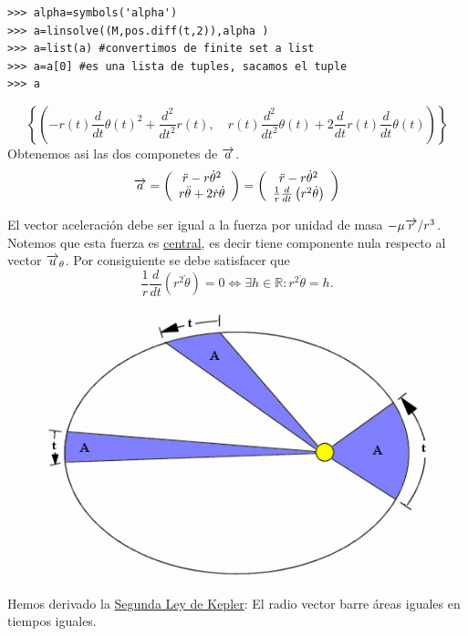 \begin{lstlisting}
>>> alpha=symbols('alpha')
>>> a=linsolve((M,pos.diff(t,2)),alpha )
>>> a=list(a) #convertimos de finite set a list
>>> a=a[0] #es una lista de tuples, sacamos el tuple
>>> a
\end{lstlisting}

\[
 \left\{\left ( - r{\left (t \right )} \frac{d}{d t} \theta{\left (t \right )}^{2} + \frac{d^{2}}{d t^{2}}  r{\left (t \right )}, \quad r{\left (t \right )} \frac{d^{2}}{d t^{2}}  \theta{\left (t \right )} + 2 \frac{d}{d t} r{\left (t \right )} \frac{d}{d t} \theta{\left (t \right )}\right )\right\}
\]
Obtenemos asi las dos componetes de $\overrightarrow{a}$.
\[
\overrightarrow{a}=\left(\begin{array}{c}
\ddot{r}-r\dot{\theta}^2 \\
r\ddot{\theta}+2\dot{r}\dot{\theta}
\end{array}
\right)=
\left(\begin{array}{c}
\ddot{r}-r\dot{\theta}^2 \\
\frac{1}{r}\frac{d}{dt} \left( r^2\dot{\theta} \right)
\end{array}
\right)
\]


El vector aceleración debe ser igual a la fuerza por unidad de masa $-\mu \overrightarrow{r}/r^3$. Notemos que esta fuerza es
\href{http://es.wikipedia.org/wiki/Campo_central}{central}, es decir tiene componente nula
respecto al vector $\overrightarrow{u}_{\theta}$. Por consiguiente se debe satisfacer que
\[\frac{1}{r}\frac{d}{dt} \left( r^2\dot{\theta} \right)=0\Longleftrightarrow \exists h\in\mathbb{R}: \boxed{ r^2\dot{\theta}=h}. \]




\begin{figure}
\includegraphics[scale=.3]{imagenes/2leykepler.jpeg}\\
\end{figure}
Hemos derivado la \href{http://es.wikipedia.org/wiki/Leyes_de_Kepler}{Segunda Ley de Kepler}: El radio vector barre áreas iguales en tiempos iguales.



